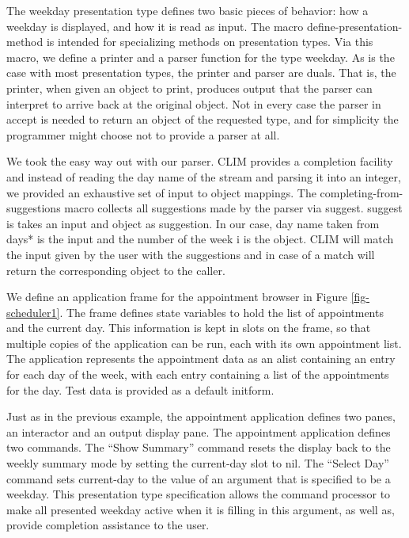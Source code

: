 \documentclass[twocolumn,a4paper]{article}
\newcommand {\code}[1]{{\sffamily #1}}
\newcommand {\CLIM}{{\small CLIM}}
\let\constant\code
\let\variable\code
\let\macro\code
\begin{document}
\begin{figure*}
\lstset{style=framestyle}

\caption{Scheduler: application frame, presentation type and commands}\label{fig-scheduler1}
\end{figure*}
\begin{figure*}
\lstset{style=framestyle}

\caption{Scheduler: display functions}\label{fig-scheduler2}
\end{figure*}

The weekday presentation type defines two basic pieces of behavior:
how a weekday is displayed, and how it is read as input. The macro
\macro{define-presentation-method} is intended for specializing
methods on presentation types.  Via this macro, we define a printer
and a parser function for the type \code{weekday}. As is the case with
most presentation types, the printer and parser are duals. That is,
the printer, when given an object to print, produces output that the
parser can interpret to arrive back at the original object. Not in
every case the parser in \code{accept} is needed to return an object
of the requested type, and for simplicity the programmer might choose
not to provide a parser at all.

We took the easy way out with our parser. \CLIM{} provides a
completion facility and instead of reading the day name of the stream
and parsing it into an integer, we provided an exhaustive set of input
to object mappings. The \macro{completing-from-suggestions} macro
collects all suggestions made by the parser via
\code{suggest}. \code{suggest} is takes an input and object as
suggestion. In our case, day name taken from \variable{*days*} is the
input and the number of the week \variable{i} is the object. \CLIM{}
will match the input given by the user with the suggestions and in
case of a match will return the corresponding object to the caller.

We define an application frame for the appointment browser in Figure
\ref{fig-scheduler1}. The frame defines state variables to hold the
list of appointments and the current day. This information is kept in
slots on the frame, so that multiple copies of the application can be
run, each with its own appointment list. The application represents
the appointment data as an alist containing an entry for each day of
the week, with each entry containing a list of the appointments for
the day. Test data is provided as a default initform.

Just as in the previous example, the appointment application defines
two panes, an interactor and an output display pane. The appointment
application defines two commands. The ``Show Summary'' command resets
the display back to the weekly summary mode by setting the
\variable{current-day} slot to \constant{nil}. The ``Select Day''
command sets \variable{current-day} to the value of an argument that
is specified to be a weekday. This presentation type specification
allows the command processor to make all presented weekday active when
it is filling in this argument, as well as, provide completion
assistance to the user.
\end{document}
